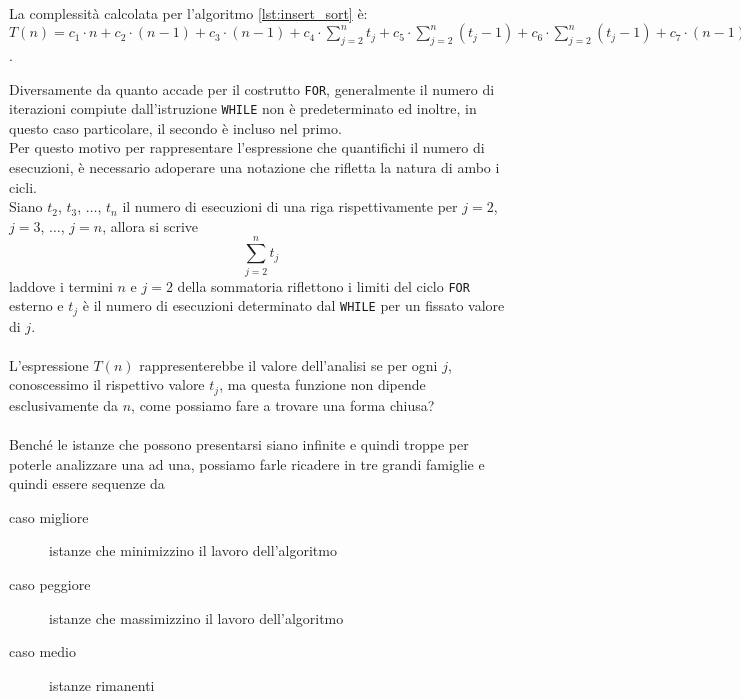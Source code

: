\documentclass[11pt,a4paper,oneside]{article}
\begin{document}
\paragraph*{}La complessità calcolata per l'algoritmo \ref{lst:insert_sort} è:
$T(n) = c_1 \cdot n + c_2 \cdot (n-1) + c_3 \cdot (n-1) + c_4 \cdot \sum_{j=2}^{n}t_j + c_5 \cdot \sum_{j=2}^{n}(t_j-1) + c_6 \cdot \sum_{j=2}^{n}(t_j-1) +  c_7 \cdot (n-1)$.\\
\begin{tcolorbox}[title=Per fare chiarezza]
	Diversamente da quanto accade per il costrutto \texttt{FOR}, generalmente il numero di iterazioni compiute dall'istruzione \texttt{WHILE} non è predeterminato ed inoltre, in questo caso particolare, il secondo è incluso nel primo.\\Per questo motivo per rappresentare l'espressione che quantifichi il numero di esecuzioni, è necessario adoperare una notazione che rifletta la natura di ambo i cicli.\\
	Siano $t_2$, $t_3$, $\dots$, $t_n$ il numero di esecuzioni di una riga rispettivamente per $j=2$, $j=3$, $\dots$, $j=n$, allora si scrive $$\sum_{j=2}^{n} t_j$$ laddove i termini $n$ e $j=2$ della sommatoria riflettono i limiti del ciclo \texttt{FOR} esterno e $t_j$ è il numero di esecuzioni determinato dal \texttt{WHILE} per un fissato valore di $j$.
\end{tcolorbox}
\paragraph*{}L'espressione $T(n)$ rappresenterebbe il valore dell'analisi se per ogni $j$, conoscessimo il rispettivo valore $t_j$, ma questa funzione non dipende esclusivamente da $n$, come possiamo fare a trovare una forma chiusa?
\paragraph*{}Benché le istanze che possono presentarsi siano infinite e quindi troppe per poterle analizzare una ad una, possiamo farle ricadere in tre grandi famiglie e quindi essere sequenze da
\begin{description}
	\item [caso migliore] istanze che minimizzino il lavoro dell'algoritmo
	\item [caso peggiore] istanze che massimizzino il lavoro dell'algoritmo
	\item [caso medio] istanze rimanenti
\end{description}
\end{document}
